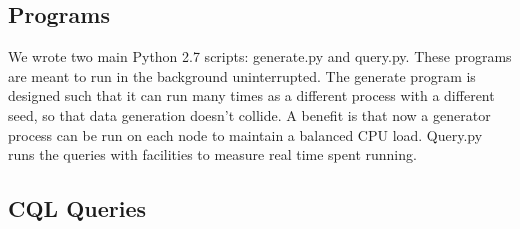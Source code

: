 \documentclass[letterpaper]{article}
\begin{document}
\subsection{Programs}

We wrote two main Python 2.7 scripts: generate.py and query.py. These programs are meant to run in
the background uninterrupted.
The generate program is designed such that it can run many times as a different process with a
different seed, so that data generation doesn't collide.
A benefit is that now a generator process can be run on each node to maintain a balanced CPU load.
Query.py runs the queries with facilities to measure real time spent running.

\subsection{CQL Queries}
\end{document}
